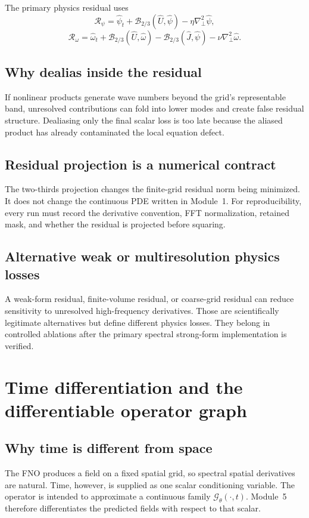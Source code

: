 \documentclass[11pt]{article}
\newcommand{\Lap}{\nabla_\perp^2}
\newcommand{\Rpsi}{\mathcal{R}_{\psi}}
\newcommand{\Romega}{\mathcal{R}_{\omega}}
\begin{document}
The primary physics residual uses
\begin{equation}
\Rpsi=\widehat\psi_t+\mathcal{B}_{2/3}(\widehat U,\widehat\psi)-\eta\Lap\widehat\psi,
\end{equation}
\begin{equation}
\Romega=\widehat\omega_t+\mathcal{B}_{2/3}(\widehat U,\widehat\omega)
-\mathcal{B}_{2/3}(\widehat J,\widehat\psi)-\nu\Lap\widehat\omega.
\end{equation}

\subsection{Why dealias inside the residual}
If nonlinear products generate wave numbers beyond the grid's representable band, unresolved contributions can fold into lower modes and create false residual structure. Dealiasing only the final scalar loss is too late because the aliased product has already contaminated the local equation defect.

\subsection{Residual projection is a numerical contract}
The two-thirds projection changes the finite-grid residual norm being minimized. It does not change the continuous PDE written in Module~1. For reproducibility, every run must record the derivative convention, FFT normalization, retained mask, and whether the residual is projected before squaring.

\subsection{Alternative weak or multiresolution physics losses}
A weak-form residual, finite-volume residual, or coarse-grid residual can reduce sensitivity to unresolved high-frequency derivatives. Those are scientifically legitimate alternatives but define different physics losses. They belong in controlled ablations after the primary spectral strong-form implementation is verified.

\section{Time differentiation and the differentiable operator graph}
\label{sec:derivatives}

\subsection{Why time is different from space}
The FNO produces a field on a fixed spatial grid, so spectral spatial derivatives are natural. Time, however, is supplied as one scalar conditioning variable. The operator is intended to approximate a continuous family $\mathcal{G}_\theta(\cdot,t)$. Module~5 therefore differentiates the predicted fields with respect to that scalar.
\end{document}
